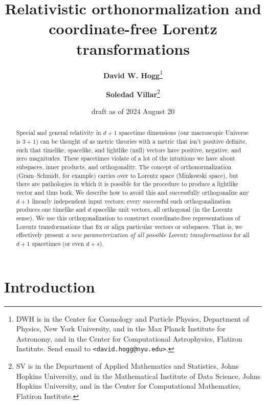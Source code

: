 \documentclass{article}
\title{\bfseries Relativistic orthonormalization and coordinate-free Lorentz transformations}
\author{\textbf{David W. Hogg}\footnote{DWH is in the Center for Cosmology and Particle Physics, Department of Physics, New York University, and in the Max Planck Institute for Astronomy, and in the Center for Computational Astrophysics, Flatiron Institute. Send email to \texttt{<david.hogg@nyu.edu>}.}
        \and
        \textbf{Soledad Villar}\footnote{SV is in the Department of Applied Mathematics and Statistics, Johns Hopkins University, and in the Mathematical Institute of Data Science, Johns Hopkins University, and in the Center for Computational Mathematics, Flatiron Institute.}}
\date{draft as of 2024 August 20}
\newcommand{\plus}{\!+\!} %
\begin{document}
\thispagestyle{plain}
\maketitle

\begin{abstract}\noindent
    Special and general relativity in $d\plus1$ spacetime dimensions (our macroscopic Universe is $3\plus1$) can be thought of as metric theories with a metric that isn't positive definite, such that timelike, spacelike, and lightlike (null) vectors have positive, negative, and zero magnitudes.
    These spacetimes violate of a lot of the intuitions we have about subspaces, inner products, and orthogonality.
    The concept of orthonormalization (Gram--Schmidt, for example) carries over to Lorentz space (Minkowski space), but there are pathologies in which it is possible for the procedure to produce a lightlike vector and thus bork.
    We describe how to avoid this and successfully orthogonalize any $d+1$ linearly independent input vectors; every successful such orthogonalization produces one timelike and $d$ spacelike unit vectors, all orthogonal (in the Lorentz sense).
    We use this orthogonalization to construct coordinate-free representations of Lorentz transformations that fix or align particular vectors or subspaces.
    That is, we effectively present \emph{a new parameterization of all possible Lorentz transformations} for all $d\plus1$ spacetimes (or even $d\plus s$).
\end{abstract}

\section{Introduction}\label{sec:intro}
\end{document}
